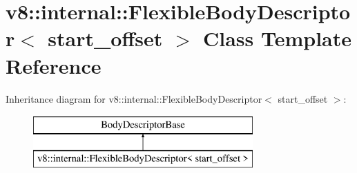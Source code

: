 \hypertarget{classv8_1_1internal_1_1_flexible_body_descriptor}{}\section{v8\+:\+:internal\+:\+:Flexible\+Body\+Descriptor$<$ start\+\_\+offset $>$ Class Template Reference}
\label{classv8_1_1internal_1_1_flexible_body_descriptor}
Inheritance diagram for v8\+:\+:internal\+:\+:Flexible\+Body\+Descriptor$<$ start\+\_\+offset $>$\+:\begin{figure}[H]
\begin{center}
\leavevmode
\includegraphics[height=2.000000cm]{classv8_1_1internal_1_1_flexible_body_descriptor}
\end{center}
\end{figure}
